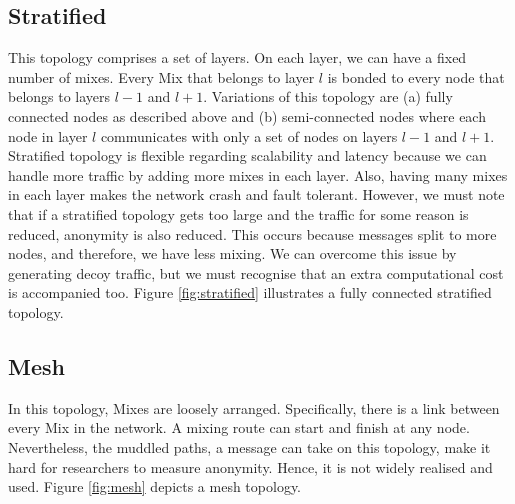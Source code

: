 \documentclass[logo,msc,cyber]{infthesis}   %
\begin{document}
\subsection{Stratified}
This topology comprises a set of layers. On each layer, we can have a fixed
number of mixes. Every Mix that belongs to layer $l$ is bonded to every node
that belongs to layers $l-1$ and $l+1$\cite{piotrowska2017loopix}. Variations of
this topology are (a) fully connected nodes as described above and (b)
semi-connected nodes where each node in layer $l$ communicates with only a set
of nodes on layers $l-1$ and $l+1$\cite{ben2021mixim}. Stratified topology is
flexible regarding scalability and latency because we can handle more traffic by
adding more mixes in each layer. Also, having many mixes in each layer makes the
network crash and fault tolerant\cite{erodotos}. However, we must note that if a
stratified topology gets too large and the traffic for some reason is reduced,
anonymity is also reduced. This occurs because messages split to more nodes, and
therefore, we have less mixing. We can overcome this issue by generating decoy
traffic, but we must recognise that an extra computational cost is accompanied
too. Figure \ref{fig:stratified} illustrates a fully connected stratified
topology.

\subsection{Mesh}
In this topology, Mixes are loosely arranged. Specifically, there is a link
between every Mix in the network. A mixing route can start and finish at any
node. Nevertheless, the muddled paths, a message can take on this topology, make
it hard for researchers to measure anonymity. Hence, it is not widely realised
and used. Figure \ref{fig:mesh} depicts a mesh topology.
\end{document}
